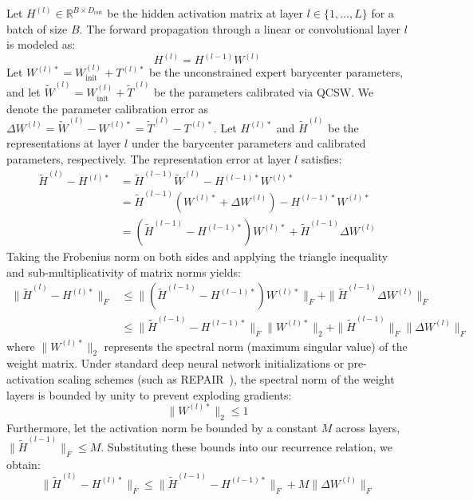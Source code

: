 \documentclass{article}
\theoremstyle{plain}
\theoremstyle{definition}
\theoremstyle{remark}
\begin{document}
Let $H^{(l)} \in \mathbb{R}^{B \times D_{\text{out}}}$ be the hidden activation matrix at layer $l \in \{1, \dots, L\}$ for a batch of size $B$. The forward propagation through a linear or convolutional layer $l$ is modeled as:
\begin{equation}
H^{(l)} = H^{(l-1)} W^{(l)}
\end{equation}
Let $W^{(l)*} = W^{(l)}_{\text{init}} + T^{(l)*}$ be the unconstrained expert barycenter parameters, and let $\tilde{W}^{(l)} = W^{(l)}_{\text{init}} + \tilde{T}^{(l)}$ be the parameters calibrated via QCSW. We denote the parameter calibration error as $\Delta W^{(l)} = \tilde{W}^{(l)} - W^{(l)*} = \tilde{T}^{(l)} - T^{(l)*}$.
Let $H^{(l)*}$ and $\tilde{H}^{(l)}$ be the representations at layer $l$ under the barycenter parameters and calibrated parameters, respectively. The representation error at layer $l$ satisfies:
\begin{align}
\tilde{H}^{(l)} - H^{(l)*} &= \tilde{H}^{(l-1)} \tilde{W}^{(l)} - H^{(l-1)*} W^{(l)*} \nonumber \\
&= \tilde{H}^{(l-1)} (W^{(l)*} + \Delta W^{(l)}) - H^{(l-1)*} W^{(l)*} \nonumber \\
&= (\tilde{H}^{(l-1)} - H^{(l-1)*}) W^{(l)*} + \tilde{H}^{(l-1)} \Delta W^{(l)}
\end{align}
Taking the Frobenius norm on both sides and applying the triangle inequality and sub-multiplicativity of matrix norms yields:
\begin{align}
\|\tilde{H}^{(l)} - H^{(l)*}\|_F &\le \|(\tilde{H}^{(l-1)} - H^{(l-1)*}) W^{(l)*}\|_F + \|\tilde{H}^{(l-1)} \Delta W^{(l)}\|_F \nonumber \\
&\le \|\tilde{H}^{(l-1)} - H^{(l-1)*}\|_F \|W^{(l)*}\|_2 + \|\tilde{H}^{(l-1)}\|_F \|\Delta W^{(l)}\|_F
\end{align}
where $\|W^{(l)*}\|_2$ represents the spectral norm (maximum singular value) of the weight matrix. Under standard deep neural network initializations or pre-activation scaling schemes (such as REPAIR~\cite{jordan2023repair}), the spectral norm of the weight layers is bounded by unity to prevent exploding gradients:
\begin{equation}
\|W^{(l)*}\|_2 \le 1
\end{equation}
Furthermore, let the activation norm be bounded by a constant $M$ across layers, $\|\tilde{H}^{(l-1)}\|_F \le M$. Substituting these bounds into our recurrence relation, we obtain:
\begin{equation}
\|\tilde{H}^{(l)} - H^{(l)*}\|_F \le \|\tilde{H}^{(l-1)} - H^{(l-1)*}\|_F + M \|\Delta W^{(l)}\|_F
\end{equation}
\end{document}
